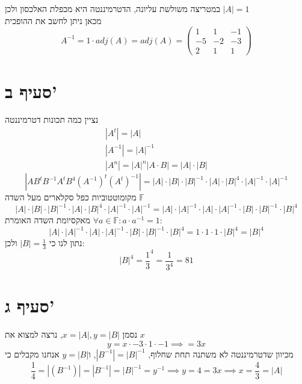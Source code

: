 \documentclass[12pt, titlepage]{article}
\begin{document}
במטריצה משולשת עליונה, הדטרמיננטה היא מכפלת האלכסון ולכן $\left|A\right| = 1$\\
מכאן ניתן לחשב את ההופכית
\[
    A^{-1} = 1 \cdot adj\left(A\right) = adj\left(A\right) = \begin{pmatrix}
        1 & 1 & -1 \\
        -5 & -2 & -3 \\
        2 & 1 & 1
    \end{pmatrix}
\]
\section*{סעיף ב'}
נציין כמה תכונות דטרמיננטה
\begin{gather*}
    \left|A^t\right| = \left|A\right| \\
    \left|A^{-1}\right| = \left|A\right|^{-1} \\
    \left|A^{n}\right| = \left|A\right|^{n}
    \left|A\cdot B\right| = \left|A\right| \cdot \left|B\right|
\end{gather*}
\[
    \left|AB^{t}B^{-1}A^{t}B^{4}\left(A^{-1}\right)^{t}\left(A^{t}\right)^{-1}\right| = \left|A\right| \cdot \left|B\right| \cdot \left|B\right|^{-1} \cdot \left|A\right| \cdot \left|B\right|^{4} \cdot \left|A\right|^{-1} \cdot \left|A\right|^{-1}
\]
מקומוטטוביות כפל סקלארים מעל השדה $\mathbb{F}$
\[
    \left|A\right| \cdot \left|B\right| \cdot \left|B\right|^{-1} \cdot \left|A\right| \cdot \left|B\right|^{4} \cdot \left|A\right|^{-1} \cdot \left|A\right|^{-1} = \left|A\right|\cdot\left|A\right|^{-1}\cdot\left|A\right|\cdot\left|A\right|^{-1}\cdot \left|B\right|\cdot\left|B\right|^{-1}\cdot\left|B\right|^{4}
\]
מאקסיומת השדה האומרת $\forall a\in\mathbb{F}: a\cdot a^{-1} = 1$: 
\[
    \left|A\right|\cdot\left|A\right|^{-1}\cdot\left|A\right|\cdot\left|A\right|^{-1}\cdot \left|B\right|\cdot\left|B\right|^{-1}\cdot\left|B\right|^{4} = 1 \cdot 1 \cdot 1 \cdot \left|B\right|^{4} = \left|B\right|^{4}
\]
נתון לנו כי $\left|B\right|=\frac{1}{3}$ ולכן:
\[
    \boxed{  \left|B\right|^{4} = \frac{1}{3}^4 = \frac{1}{3^4} = 81}
\]
\section*{סעיף ג'}
נסמן $x=\left|A\right|,y=\left|B\right|$, נרצה למצוא את $x$
\[
    y = x \cdot -3 \cdot 1 \cdot -1 \implies = 3x
\]
מכיוון שדטרמיננטה לא משתנה תחת שחלוף, $\left|B^{-1}\right|=\left|B\right|^{-1}$, ו$y=\left|B\right|$ אנחנו מקבלים כי
\[
    \frac{1}{4} = \left|\left(B^{-1}\right)\right| = \left|B^{-1}\right| = \left|B\right|^{-1} = y^{-1} \implies y=4 = 3x \implies x = \frac{4}{3} = \left|A\right|
\]
\newpage
\end{document}
